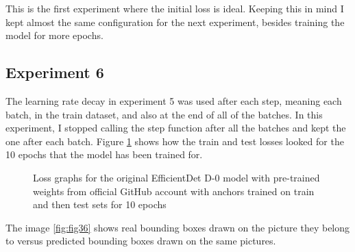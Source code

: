 This is the first experiment where the initial loss is ideal. Keeping this in mind I kept almost the same configuration for the next experiment, besides training the model for more epochs.

\subsection{Experiment 6}

The learning rate decay in experiment 5 was used after each step, meaning each batch, in the train dataset, and also at the end of all of the batches. In this experiment, I stopped calling the step function after all the batches and kept the one after each batch. Figure \ref{fig:fig35} shows how the train and test losses looked for the 10 epochs that the model has been trained for.

\begin{figure}[H]
    \label{fig:fig35}
    \caption{Loss graphs for the original EfficientDet D-0 model with pre-trained weights from official GitHub account with anchors trained on train and then test sets for 10 epochs}
\end{figure}

The image \ref{fig:fig36} shows real bounding boxes drawn on the picture they belong to versus predicted bounding boxes drawn on the same pictures.

